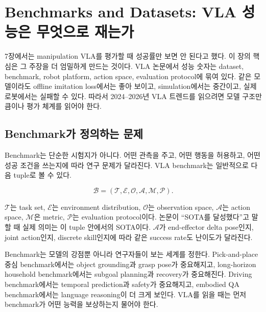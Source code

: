\chapter{Benchmarks and Datasets: VLA 성능은 무엇으로 재는가}
\label{ch:benchmarks_datasets}

7장에서는 manipulation VLA를 평가할 때 성공률만 보면 안 된다고 했다. 이 장의 핵심은 그 주장을 더 엄밀하게 만드는 것이다. VLA 논문에서 성능 숫자는 dataset, benchmark, robot platform, action space, evaluation protocol에 묶여 있다. 같은 모델이라도 offline imitation loss에서는 좋아 보이고, simulation에서는 중간이고, 실제 로봇에서는 실패할 수 있다. 따라서 2024--2026년 VLA 트렌드를 읽으려면 모델 구조만큼이나 평가 체계를 읽어야 한다.

\section{Benchmark가 정의하는 문제}

Benchmark는 단순한 시험지가 아니다. 어떤 관측을 주고, 어떤 행동을 허용하고, 어떤 성공 조건을 쓰는지에 따라 연구 문제가 달라진다. VLA benchmark는 일반적으로 다음 tuple로 볼 수 있다.

\begin{equation}
  \mathcal{B}
  =
  \left(
    \mathcal{T},
    \mathcal{E},
    \mathcal{O},
    \mathcal{A},
    \mathcal{M},
    \mathcal{P}
  \right).
\end{equation}

$\mathcal{T}$는 task set, $\mathcal{E}$는 environment distribution, $\mathcal{O}$는 observation space, $\mathcal{A}$는 action space, $\mathcal{M}$은 metric, $\mathcal{P}$는 evaluation protocol이다. 논문이 ``SOTA를 달성했다''고 말할 때 실제 의미는 이 tuple 안에서의 SOTA이다. $\mathcal{A}$가 end-effector delta pose인지, joint action인지, discrete skill인지에 따라 같은 success rate도 난이도가 달라진다.

Benchmark는 모델의 강점뿐 아니라 연구자들이 보는 세계를 정한다. Pick-and-place 중심 benchmark에서는 object grounding과 grasp pose가 중요해지고, long-horizon household benchmark에서는 subgoal planning과 recovery가 중요해진다. Driving benchmark에서는 temporal prediction과 safety가 중요해지고, embodied QA benchmark에서는 language reasoning이 더 크게 보인다. VLA를 읽을 때는 먼저 benchmark가 어떤 능력을 보상하는지 물어야 한다.


